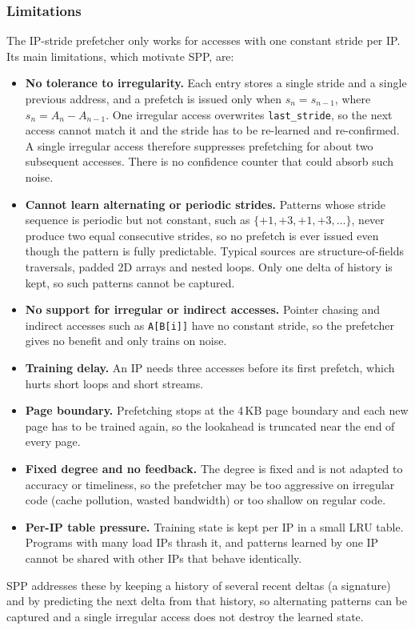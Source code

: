 \documentclass[11pt,a4paper]{article}
\begin{document}
\subsubsection{Limitations}
The IP-stride prefetcher only works for accesses with one constant stride per IP. Its main
limitations, which motivate SPP, are:
\begin{itemize}
    \item \textbf{No tolerance to irregularity.} Each entry stores a single stride and a single
          previous address, and a prefetch is issued only when $s_n = s_{n-1}$, where
          $s_n = A_n - A_{n-1}$. One irregular access overwrites \texttt{last\_stride}, so the
          next access cannot match it and the stride has to be re-learned and re-confirmed. A single
          irregular access therefore suppresses prefetching for about two subsequent accesses.
          There is no confidence counter that could absorb such noise.
    \item \textbf{Cannot learn alternating or periodic strides.} Patterns whose stride sequence is
          periodic but not constant, such as $\{+1,+3,+1,+3,\dots\}$, never produce two equal
          consecutive strides, so no prefetch is ever issued even though the pattern is fully
          predictable. Typical sources are structure-of-fields traversals, padded 2D arrays and
          nested loops. Only one delta of history is kept, so such patterns cannot be captured.
    \item \textbf{No support for irregular or indirect accesses.} Pointer chasing and indirect
          accesses such as \texttt{A[B[i]]} have no constant stride, so the prefetcher gives no
          benefit and only trains on noise.
    \item \textbf{Training delay.} An IP needs three accesses before its first prefetch, which
          hurts short loops and short streams.
    \item \textbf{Page boundary.} Prefetching stops at the 4\,KB page boundary and each new page
          has to be trained again, so the lookahead is truncated near the end of every page.
    \item \textbf{Fixed degree and no feedback.} The degree is fixed and is not adapted to
          accuracy or timeliness, so the prefetcher may be too aggressive on irregular code
          (cache pollution, wasted bandwidth) or too shallow on regular code.
    \item \textbf{Per-IP table pressure.} Training state is kept per IP in a small LRU table.
          Programs with many load IPs thrash it, and patterns learned by one IP cannot be shared
          with other IPs that behave identically.
\end{itemize}
SPP addresses these by keeping a history of several recent deltas (a signature) and by predicting
the next delta from that history, so alternating patterns can be captured and a single irregular
access does not destroy the learned state.
\end{document}
